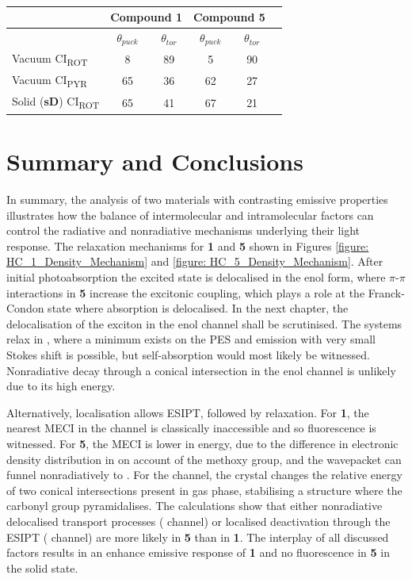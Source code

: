 \begin{table}
  \centering
  \caption[]{} 
  \label{table: conical_parameters}
  \begin{tabular}{lccccc}
  \hline
  & \multicolumn{2}{c}{Compound \textbf{1}} & \multicolumn{2}{c}{Compound \textbf{5}}\\
  \hline
  & $\theta_{puck}$ & $\theta_{tor}$ & $\theta_{puck}$ & $\theta_{tor}$ \\
  \hline
  Vacuum CI\textsubscript{ROT} & 8\textdegree{} & 89\textdegree{} & 5\textdegree{} & 90\textdegree{}\\
  Vacuum CI\textsubscript{PYR} & 65\textdegree{} & 36\textdegree{} & 62\textdegree{} & 27\textdegree{}\\
  Solid (\textbf{sD}) CI\textsubscript{ROT} & 65\textdegree{} & 41\textdegree{} & 67\textdegree{}&21\textdegree{}\\
  \hline
  \end{tabular}
\end{table}

\section{Summary and Conclusions}\label{section: Inter_conclusions}

In summary, the analysis of two materials with contrasting emissive properties illustrates how the balance of intermolecular and intramolecular factors can control the radiative and nonradiative mechanisms underlying their light response. The relaxation mechanisms for \textbf{1} and \textbf{5} shown in Figures \ref{figure: HC_1_Density_Mechanism} and \ref{figure: HC_5_Density_Mechanism}. After initial photoabsorption the excited state is delocalised in the enol form, where $\pi$-$\pi$ interactions in \textbf{5} increase the excitonic coupling, which plays a role at the Franck-Condon state where absorption is delocalised. In the next chapter, the delocalisation of the exciton in the enol channel shall be scrutinised. The systems relax in \Estar{}, where a minimum exists on the PES and emission with very small Stokes shift is possible, but self-absorption would most likely be witnessed. Nonradiative decay through a conical intersection in the enol channel is unlikely due to its high energy. 

Alternatively, localisation allows ESIPT, followed by relaxation. For \textbf{1}, the nearest MECI in the \Kstar{} channel is classically inaccessible and so fluorescence is witnessed. For \textbf{5}, the MECI is lower in energy, due to the difference in electronic density distribution in \sone{} on account of the methoxy group, and the wavepacket can funnel nonradiatively to \szero{}. For the \Kstar{} channel, the crystal changes the relative energy of two conical intersections present in gas phase, stabilising a structure where the carbonyl group pyramidalises. The calculations show that either nonradiative delocalised transport processes (\Estar{} channel) or localised deactivation through the ESIPT (\Kstar{} channel) are more likely in \textbf{5} than in \textbf{1}. The interplay of all discussed factors results in an enhance emissive response of \textbf{1} and no fluorescence in \textbf{5} in the solid state. 


